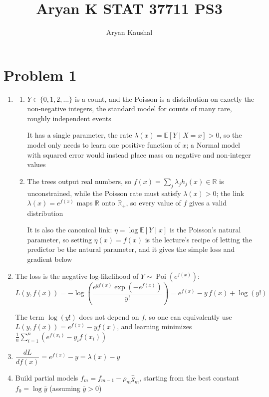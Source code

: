 \documentclass{article}
\title{Aryan K STAT 37711 PS3}
\author{Aryan Kaushal}
\begin{document}
\maketitle


\section*{Problem 1}

\begin{enumerate}[label=\alph*.]
\item
\begin{enumerate}[label=\roman*.]
\item $Y\in\{0,1,2,\ldots\}$ is a count, and the Poisson is a distribution on exactly the non-negative integers, the standard model for counts of many rare, roughly independent events

It has a single parameter, the rate $\lambda(x)=\mathbb E[Y\mid X=x]>0$, so the model only needs to learn one positive function of $x$; a Normal model with squared error would instead place mass on negative and non-integer values

\item The trees output real numbers, so $f(x)=\sum_j\lambda_jh_j(x)\in\mathbb R$ is unconstrained, while the Poisson rate must satisfy $\lambda(x)>0$; the link $\lambda(x)=e^{f(x)}$ maps $\mathbb R$ onto $\mathbb R_+$, so every value of $f$ gives a valid distribution

It is also the canonical link: $\eta=\log\mathbb E[Y\mid x]$ is the Poisson's natural parameter, so setting $\eta(x)=f(x)$ is the lecture's recipe of letting the predictor be the natural parameter, and it gives the simple loss and gradient below
\end{enumerate}

\item The loss is the negative log-likelihood of $Y\sim\operatorname{Poi}(e^{f(x)})$:
\[L(y,f(x))=-\log\left(\frac{e^{yf(x)}\exp(-e^{f(x)})}{y!}\right)=e^{f(x)}-y\,f(x)+\log(y!)\]

The term $\log(y!)$ does not depend on $f$, so one can equivalently use $L(y,f(x))=e^{f(x)}-yf(x)$, and learning minimizes $\frac{1}{n}\sum_{i=1}^n\left(e^{f(x_i)}-y_if(x_i)\right)$

\item $\dfrac{dL}{df(x)}=e^{f(x)}-y=\lambda(x)-y$

\item Build partial models $f_m=f_{m-1}-\rho_m\hat g_m$, starting from the best constant $f_0=\log\bar y$ (assuming $\bar y>0$)


\end{enumerate}
\end{document}
